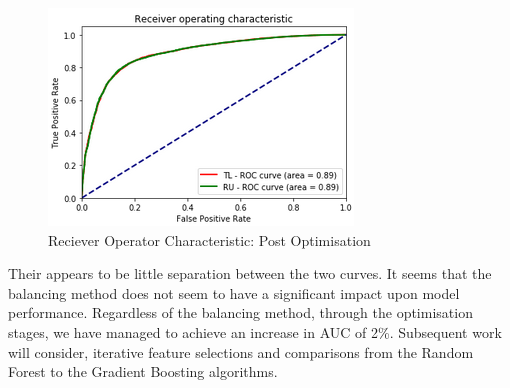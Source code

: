 \documentclass[11pt, oneside]{article}   	%
\begin{document}
\begin{figure}[h]\label{fig:roc2}
  \includegraphics[width=0.5\linewidth,center] {roc2.png}
  \caption{Reciever Operator Characteristic: Post Optimisation}
\end{figure}

Their appears to be little separation between the two curves.  It seems that the balancing method does not seem to have a significant impact upon model performance. Regardless of the balancing method, through the optimisation stages, we have managed to achieve an increase in AUC of 2\%. Subsequent work will consider, iterative feature selections and comparisons from the Random Forest to the Gradient Boosting algorithms. 
\end{document}
